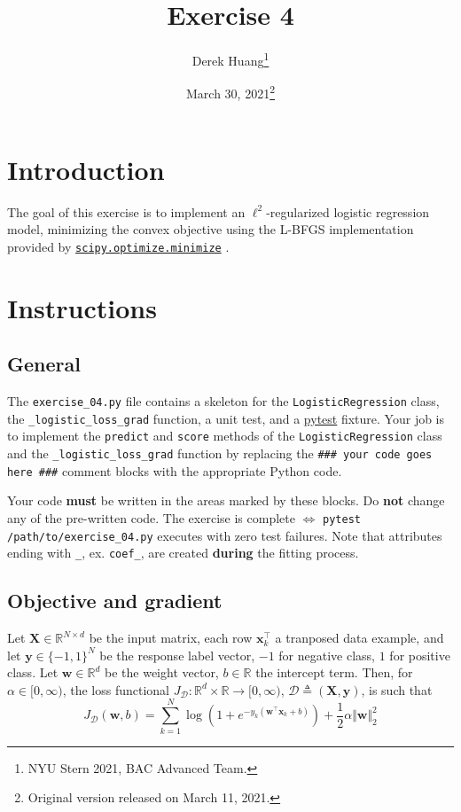 \documentclass{article}
\title{Exercise 4}
\author{Derek Huang\thanks{NYU Stern 2021, BAC Advanced Team.}}
\date{March 30, 2021\thanks{Original version released on March 11, 2021.}}
\numberwithin{equation}{section}
\newcommand{\pytest}{\href{https://docs.pytest.org/en/stable/}{pytest}}
\newcommand{\minimize}{%
    \href{%
        https://docs.scipy.org/doc/scipy/reference/generated/%
        scipy.optimize.minimize.html%
    }{\texttt{scipy.optimize.minimize}}%
}
\newcommand{\loglossgrad}{\texttt{\_logistic\_loss\_grad}}
\begin{document}
\maketitle
\thispagestyle{fancy}


\section{Introduction}

The goal of this exercise is to implement an $ \ell^2 $-regularized logistic
regression model, minimizing the convex objective using the L-BFGS
implementation provided by \minimize.

\section{Instructions}

\subsection{General}

The \texttt{exercise\_04.py} file contains a skeleton for the
\texttt{LogisticRegression} class, the \loglossgrad{} function, a unit test,
and a \pytest{} fixture. Your job is to implement the \texttt{predict} and
\texttt{score} methods of the \texttt{LogisticRegression} class and the
\loglossgrad{} function by replacing the
\texttt{\#\#\# your code goes here \#\#\#} comment blocks with the appropriate
Python code.

\medskip

Your code \textbf{must} be written in the areas marked by these blocks. Do
\textbf{not} change any of the pre-written code. The exercise is complete
$ \Leftrightarrow $ \texttt{pytest /path/to/exercise\_04.py} executes with
zero test failures. Note that attributes ending with \texttt{\_}, ex.
\texttt{coef\_}, are created \textbf{during} the fitting process.

\subsection{Objective and gradient}

Let $ \mathbf{X} \in \mathbb{R}^{N \times d} $ be the input matrix, each row
$ \mathbf{x}_k^\top $ a tranposed data example, and let $ \mathbf{y} \in
\{-1, 1\}^N $ be the response label vector, $ -1 $ for negative class, $ 1 $
for positive class. Let $ \mathbf{w} \in \mathbb{R}^d $ be the weight vector,
$ b \in \mathbb{R} $ the intercept term. Then, for $ \alpha \in [0, \infty) $,
the loss functional $ J_\mathcal{D} : \mathbb{R}^d \times \mathbb{R}
\rightarrow [0, \infty) $, $ \mathcal{D} \triangleq
(\mathbf{X}, \mathbf{y}) $, is such that
\begin{equation} \label{logreg_obj}
    J_\mathcal{D}(\mathbf{w}, b) = \sum_{k = 1}^N\log\left(
        1 + e^{-y_k(\mathbf{w}^\top\mathbf{x}_k + b)}
    \right) + \frac{1}{2}\alpha\Vert\mathbf{w}\Vert_2^2
\end{equation}
\end{document}
